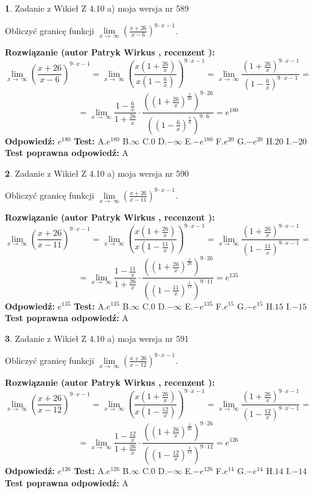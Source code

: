 \documentclass[12pt, a4paper]{article}
\theoremstyle{definition} %
\newtheorem{zad}{}
\newcommand{\zadStart}[1]{\begin{zad}#1\newline}
\newcommand{\zadStop}{\end{zad}}
\newcommand{\rozwStart}[2]{\noindent \textbf{Rozwiązanie (autor #1 , recenzent #2): }\newline}
\newcommand{\rozwStop}{\newline}
\newcommand{\odpStart}{\noindent \textbf{Odpowiedź:}\newline}
\newcommand{\odpStop}{\newline}
\newcommand{\testStart}{\noindent \textbf{Test:}\newline}
\newcommand{\testStop}{\newline}
\newcommand{\kluczStart}{\noindent \textbf{Test poprawna odpowiedź:}\newline}
\newcommand{\kluczStop}{\newline}
\begin{document}
\zadStart{Zadanie z Wikieł Z 4.10 a) moja wersja nr 589}

Obliczyć granicę funkcji  $\lim\limits_{x\to\ \infty}(\frac{x+26}{x-6})^{9\cdot x-1}$.
\zadStop
\rozwStart{Patryk Wirkus}{}
$$\lim\limits_{x\to\ \infty}(\frac{x+26}{x-6})^{9\cdot x-1} = \lim\limits_{x\to\ \infty}(\frac{x(1+\frac{26}{x})}{x(1-\frac{6}{x})})^{9\cdot x-1}=\lim\limits_{x\to\ \infty}\frac{(1+\frac{26}{x})^{9\cdot x-1}}{(1-\frac{6}{x})^{9\cdot x-1}}=$$
$$=\lim\limits_{x\to\ \infty}\frac{1-\frac{6}{x}}{1+\frac{26}{x}}\cdot\frac{((1+\frac{26}{x})^{\frac{x}{26}})^{9\cdot26}}{((1-\frac{6}{x})^{\frac{x}{6}})^{9\cdot6}}=e^{180}$$
\rozwStop
\odpStart
$e^{180}$
\odpStop
\testStart
A.$e^{180}$ B.$\infty$ C.$0$ D.$-\infty$ E.$-e^{180}$
F.$e^{20}$ G.$-e^{20}$
H.$20$
I.$-20$
\testStop
\kluczStart
A
\kluczStop



\zadStart{Zadanie z Wikieł Z 4.10 a) moja wersja nr 590}

Obliczyć granicę funkcji  $\lim\limits_{x\to\ \infty}(\frac{x+26}{x-11})^{9\cdot x-1}$.
\zadStop
\rozwStart{Patryk Wirkus}{}
$$\lim\limits_{x\to\ \infty}(\frac{x+26}{x-11})^{9\cdot x-1} = \lim\limits_{x\to\ \infty}(\frac{x(1+\frac{26}{x})}{x(1-\frac{11}{x})})^{9\cdot x-1}=\lim\limits_{x\to\ \infty}\frac{(1+\frac{26}{x})^{9\cdot x-1}}{(1-\frac{11}{x})^{9\cdot x-1}}=$$
$$=\lim\limits_{x\to\ \infty}\frac{1-\frac{11}{x}}{1+\frac{26}{x}}\cdot\frac{((1+\frac{26}{x})^{\frac{x}{26}})^{9\cdot26}}{((1-\frac{11}{x})^{\frac{x}{11}})^{9\cdot11}}=e^{135}$$
\rozwStop
\odpStart
$e^{135}$
\odpStop
\testStart
A.$e^{135}$ B.$\infty$ C.$0$ D.$-\infty$ E.$-e^{135}$
F.$e^{15}$ G.$-e^{15}$
H.$15$
I.$-15$
\testStop
\kluczStart
A
\kluczStop



\zadStart{Zadanie z Wikieł Z 4.10 a) moja wersja nr 591}

Obliczyć granicę funkcji  $\lim\limits_{x\to\ \infty}(\frac{x+26}{x-12})^{9\cdot x-1}$.
\zadStop
\rozwStart{Patryk Wirkus}{}
$$\lim\limits_{x\to\ \infty}(\frac{x+26}{x-12})^{9\cdot x-1} = \lim\limits_{x\to\ \infty}(\frac{x(1+\frac{26}{x})}{x(1-\frac{12}{x})})^{9\cdot x-1}=\lim\limits_{x\to\ \infty}\frac{(1+\frac{26}{x})^{9\cdot x-1}}{(1-\frac{12}{x})^{9\cdot x-1}}=$$
$$=\lim\limits_{x\to\ \infty}\frac{1-\frac{12}{x}}{1+\frac{26}{x}}\cdot\frac{((1+\frac{26}{x})^{\frac{x}{26}})^{9\cdot26}}{((1-\frac{12}{x})^{\frac{x}{12}})^{9\cdot12}}=e^{126}$$
\rozwStop
\odpStart
$e^{126}$
\odpStop
\testStart
A.$e^{126}$ B.$\infty$ C.$0$ D.$-\infty$ E.$-e^{126}$
F.$e^{14}$ G.$-e^{14}$
H.$14$
I.$-14$
\testStop
\kluczStart
A
\kluczStop
\end{document}

